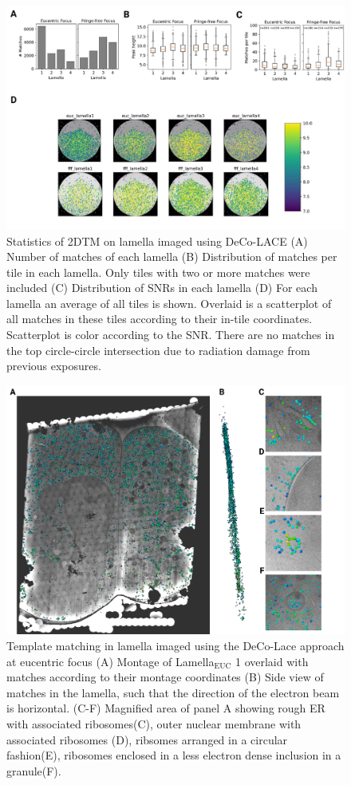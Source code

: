 \documentclass[
]{article}
\begin{document}
\begin{figure}
\hypertarget{fig:matching_stat}{%
\centering
\includegraphics{figures/matching_stat.png}
\caption{Statistics of 2DTM on lamella imaged using DeCo-LACE (A) Number of matches of
each lamella (B) Distribution of matches per tile in each lamella. Only tiles
with two or more matches were included (C) Distribution of SNRs in each lamella
(D) For each lamella an average of all tiles is shown. Overlaid is a scatterplot
of all matches in these tiles according to their in-tile coordinates.
Scatterplot is color according to the SNR. There are no matches in the top
circle-circle intersection due to radiation damage from previous exposures.}\label{fig:matching_stat}
}
\end{figure}

\begin{figure}
\hypertarget{fig:matching_euc}{%
\centering
\includegraphics{figures/matching_euc.png}
\caption{Template matching in lamella imaged using the DeCo-Lace approach at eucentric
focus (A) Montage of Lamella\(_\textrm{EUC}\) 1 overlaid with matches according to
their montage coordinates (B) Side view of matches in the lamella, such that the
direction of the electron beam is horizontal. (C-F) Magnified area of panel A
showing rough ER with associated ribosomes(C), outer nuclear membrane with
associated ribosomes (D), ribsomes arranged in a circular fashion(E), ribosomes
enclosed in a less electron dense inclusion in a granule(F).}\label{fig:matching_euc}
}
\end{figure}
\end{document}

